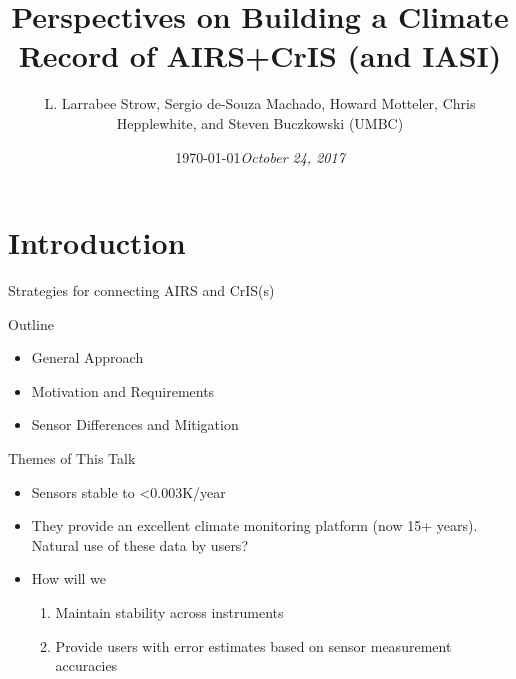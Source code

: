 \documentclass[10pt,t]{beamer}
\author{L. Larrabee Strow, Sergio de-Souza Machado, Howard Motteler, Chris Hepplewhite, and Steven Buczkowski (UMBC)}
\date{\today}
\title{Perspectives on Building a Climate Record of AIRS+CrIS (and IASI)}
\date{\textit{\footnotesize October 24, 2017}}
\begin{document}
\maketitle
{}

\section{Introduction}
\label{sec:orgbb7a7d4}

\begin{frame}[label={sec:org81af54b}]{Strategies for connecting AIRS and CrIS(s)}
\begin{block}{Outline}
\begin{itemize}
\item General Approach
\item Motivation and Requirements
\item Sensor Differences and Mitigation
\end{itemize}
\end{block}
\begin{block}{Themes of This Talk}
\begin{itemize}
\item Sensors stable to  <0.003K/year
\item They provide an excellent climate monitoring platform (now 15+ years).  Natural use of these data by users?
\item How will we 
\begin{enumerate}
\item Maintain stability across instruments
\item Provide users with error estimates based on sensor measurement accuracies
\end{enumerate}
\end{itemize}
\end{block}
\end{frame}
\end{document}
